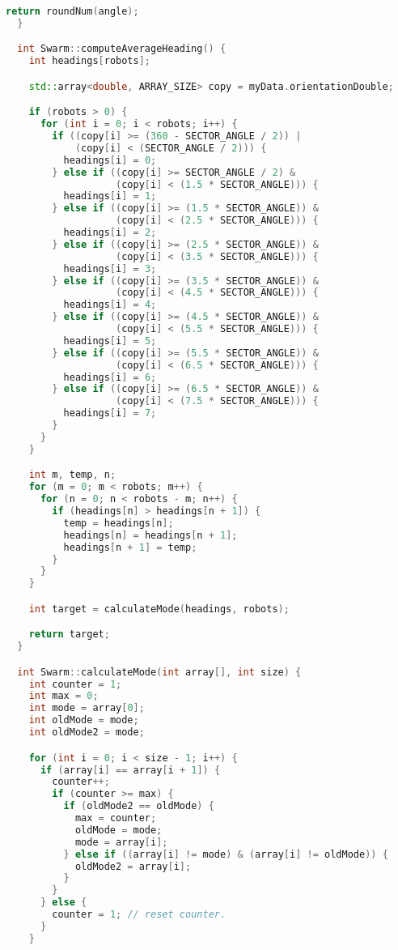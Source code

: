 \begin{lstlisting}[language=C++, caption={swarm.cpp},label={lst:swarm-header}]
    return roundNum(angle);
  }

  int Swarm::computeAverageHeading() {
    int headings[robots];

    std::array<double, ARRAY_SIZE> copy = myData.orientationDouble;

    if (robots > 0) {
      for (int i = 0; i < robots; i++) {
        if ((copy[i] >= (360 - SECTOR_ANGLE / 2)) |
            (copy[i] < (SECTOR_ANGLE / 2))) {
          headings[i] = 0;
        } else if ((copy[i] >= SECTOR_ANGLE / 2) &
                   (copy[i] < (1.5 * SECTOR_ANGLE))) {
          headings[i] = 1;
        } else if ((copy[i] >= (1.5 * SECTOR_ANGLE)) &
                   (copy[i] < (2.5 * SECTOR_ANGLE))) {
          headings[i] = 2;
        } else if ((copy[i] >= (2.5 * SECTOR_ANGLE)) &
                   (copy[i] < (3.5 * SECTOR_ANGLE))) {
          headings[i] = 3;
        } else if ((copy[i] >= (3.5 * SECTOR_ANGLE)) &
                   (copy[i] < (4.5 * SECTOR_ANGLE))) {
          headings[i] = 4;
        } else if ((copy[i] >= (4.5 * SECTOR_ANGLE)) &
                   (copy[i] < (5.5 * SECTOR_ANGLE))) {
          headings[i] = 5;
        } else if ((copy[i] >= (5.5 * SECTOR_ANGLE)) &
                   (copy[i] < (6.5 * SECTOR_ANGLE))) {
          headings[i] = 6;
        } else if ((copy[i] >= (6.5 * SECTOR_ANGLE)) &
                   (copy[i] < (7.5 * SECTOR_ANGLE))) {
          headings[i] = 7;
        }
      }
    }

    int m, temp, n;
    for (m = 0; m < robots; m++) {
      for (n = 0; n < robots - m; n++) {
        if (headings[n] > headings[n + 1]) {
          temp = headings[n];
          headings[n] = headings[n + 1];
          headings[n + 1] = temp;
        }
      }
    }

    int target = calculateMode(headings, robots);

    return target;
  }

  int Swarm::calculateMode(int array[], int size) {
    int counter = 1;
    int max = 0;
    int mode = array[0];
    int oldMode = mode;
    int oldMode2 = mode;

    for (int i = 0; i < size - 1; i++) {
      if (array[i] == array[i + 1]) {
        counter++;
        if (counter >= max) {
          if (oldMode2 == oldMode) {
            max = counter;
            oldMode = mode;
            mode = array[i];
          } else if ((array[i] != mode) & (array[i] != oldMode)) {
            oldMode2 = array[i];
          }
        }
      } else {
        counter = 1; // reset counter.
      }
    }


\end{lstlisting}
